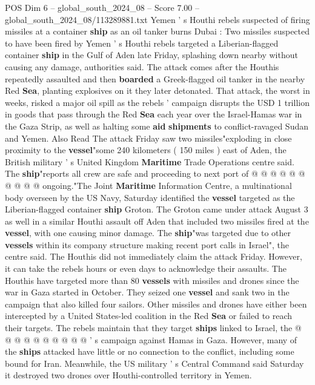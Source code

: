 \begin{textsample}{POS Dim 6 – global\_south\_2024\_08 – Score 7.00 – global\_south\_2024\_08/113289881.txt}  \label{ex:f6_pos_382}
Yemen ' s Houthi rebels suspected of firing missiles at a container \textbf{ship} as an oil tanker burns Dubai : Two missiles suspected to have been fired by Yemen ' s Houthi rebels targeted a Liberian-flagged container \textbf{ship} in the Gulf of Aden late Friday, splashing down nearby without causing any damage, authorities said.
The attack comes after the Houthis repeatedly assaulted and then \textbf{boarded} a Greek-flagged oil tanker in the nearby Red \textbf{Sea}, planting explosives on it they later detonated.
That attack, the worst in weeks, risked a major oil spill as the rebels ' campaign disrupts the USD 1 trillion in goods that pass through the Red \textbf{Sea} each year over the Israel-Hamas war in the Gaza Strip, as well as halting some \textbf{aid} \textbf{shipments} to conflict-ravaged Sudan and Yemen.
Also Read The attack Friday saw two missiles"exploding in close proximity to the \textbf{vessel}"some 240 kilometers ( 150 miles ) east of Aden, the British military ' s United Kingdom \textbf{Maritime} Trade Operations centre said.
The \textbf{ship}"reports all crew are safe and proceeding to next port of @ @ @ @ @ @ @ @ @ @ ongoing."The Joint \textbf{Maritime} Information Centre, a multinational body overseen by the US Navy, Saturday identified the \textbf{vessel} targeted as the Liberian-flagged container \textbf{ship} Groton.
The Groton came under attack August 3 as well in a similar Houthi assault off Aden that included two missiles fired at the \textbf{vessel}, with one causing minor damage.
The \textbf{ship}"was targeted due to other \textbf{vessels} within its company structure making recent port calls in Israel", the centre said.
The Houthis did not immediately claim the attack Friday.
However, it can take the rebels hours or even days to acknowledge their assaults.
The Houthis have targeted more than 80 \textbf{vessels} with missiles and drones since the war in Gaza started in October.
They seized one \textbf{vessel} and sank two in the campaign that also killed four sailors.
Other missiles and drones have either been intercepted by a United States-led coalition in the Red \textbf{Sea} or failed to reach their targets.
The rebels maintain that they target \textbf{ships} linked to Israel, the @ @ @ @ @ @ @ @ @ @ ' s campaign against Hamas in Gaza.
However, many of the \textbf{ships} attacked have little or no connection to the conflict, including some bound for Iran.
Meanwhile, the US military ' s Central Command said Saturday it destroyed two drones over Houthi-controlled territory in Yemen.

\end{textsample}
